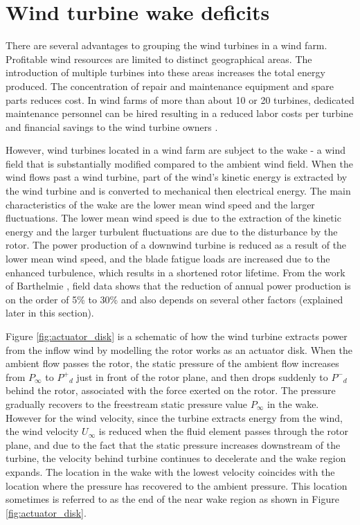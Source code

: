 \documentclass{umthesis}
\begin{document}
\section{Wind turbine wake deficits}\label{sec:wake_review}
There are several advantages to grouping the wind turbines in a wind farm. Profitable wind resources are limited to distinct geographical areas. The introduction of multiple turbines into these areas increases the total energy produced. The concentration of repair and maintenance equipment and spare parts reduces cost. In wind farms of more than about 10 or 20 turbines, dedicated maintenance personnel can be hired resulting in a reduced labor costs per turbine and financial savings to the wind turbine owners \cite{WEE}.

However, wind turbines located in a wind farm are subject to the wake - a wind field that is substantially modified compared to the ambient wind field. When the wind flows past a wind turbine, part of the wind's kinetic energy is extracted by the wind turbine and is converted to mechanical then electrical energy. The main characteristics of the wake are the lower mean wind speed and the larger fluctuations. The lower mean wind speed is due to the extraction of the kinetic energy and the larger turbulent fluctuations are due to the disturbance by the rotor. The power production of a downwind turbine is reduced as a result of the lower mean wind speed, and the blade fatigue loads are increased due to the enhanced turbulence, which results in a shortened rotor lifetime. From the work of Barthelmie \cite{Meteorological_controls}\cite{Barthelmie_Evaluation}\cite{Ten_years}, field data shows that the reduction of annual power production is on the order of 5\% to 30\% and also depends on several other factors (explained later in this section).


Figure \ref{fig:actuator_disk} is a schematic of how the wind turbine extracts power from the inflow wind by modelling the rotor works as an actuator disk. When the ambient flow passes the rotor, the static pressure of the ambient flow increases from $P_\infty$ to $P^+$$_d$ just in front of the rotor plane, and then drops suddenly to $P^-$$_d$ behind the rotor, associated with the force exerted on the rotor. The pressure gradually recovers to the freestream static pressure value $P_\infty$ in the wake. However for the wind velocity, since the turbine extracts energy from the wind, the wind velocity $U_\infty$ is reduced when the fluid element passes through the rotor plane, and due to the fact that the static pressure increases downstream of the turbine, the velocity behind turbine continues to decelerate and the wake region expands. The location in the wake with the lowest velocity coincides with the location where the pressure has recovered to the ambient pressure. This location sometimes is referred to as the end of the near wake region as shown in Figure \ref{fig:actuator_disk}.
\end{document}
